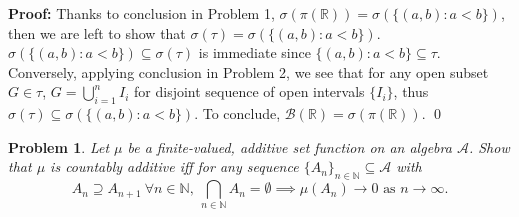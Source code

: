 \documentclass[12pt]{article}
\newtheorem{problem}{Problem}
\begin{document}
\textbf{Proof:} Thanks to conclusion in Problem 1, $\sigma(\pi(\mathbb{R}))=\sigma(\{(a, b): a<b\})$, then we are left to show that $\sigma(\tau)=\sigma(\{(a,b): a < b\})$. $\sigma(\{(a,b): a<b\})\subseteq \sigma(\tau)$ is immediate since $\{(a,b): a<b\}\subseteq \tau$. Conversely, applying conclusion in Problem 2, we see that for any open subset $G\in\tau$, $G=\bigcup_{i=1}^{n}I_i$ for disjoint sequence of open intervals $\{I_i\}$, thus $\sigma(\tau)\subseteq \sigma(\{(a, b): a<b\})$. To conclude, $\mathcal{B}(\mathbb{R})=\sigma(\pi(\mathbb{R}))$. \qed
\\
\begin{problem}
    Let $\mu$ be a finite-valued, additive set function on an algebra $\mathcal{A}$. Show that $\mu$ is countably additive iff for any sequence $\{A_n\}_{n\in\mathbb{N}}\subseteq\mathcal{A}$ with
    $$
        A_n\supseteq A_{n+1} \ \forall n\in\mathbb{N}, \ \bigcap_{n\in\mathbb{N}}A_n=\emptyset\implies \mu(A_n)\to0\text{ as } n\to\infty.
    $$
\end{problem}
\end{document}
